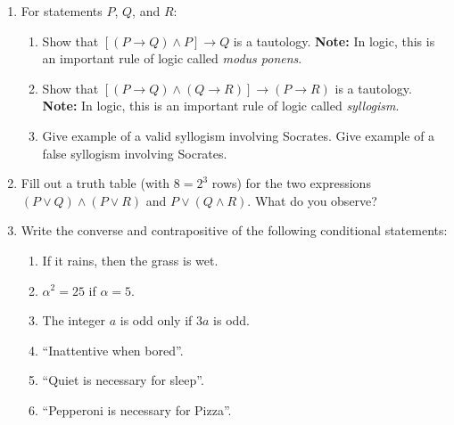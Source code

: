 \documentclass[12pt]{article}
\newcommand{\defn}[1]{{\color{blue}\sl #1}}
\begin{document}
\begin{enumerate}
 
\item
  For statements $P$, $Q$, and $R$:
  \begin{enumerate}
    
  \item Show that $[(P\to Q)\wedge P]\to Q$ is a tautology.
      {\bf Note:} In logic, this is an important rule of logic called \defn{modus ponens}.
  \item Show that $[(P\to Q)\wedge (Q\to R)]\to (P\to R)$ is a tautology.
      {\bf Note:} In logic, this is an important rule of logic called \defn{syllogism}.

    \item Give example of a valid syllogism involving Socrates.
          Give example of a false syllogism involving Socrates.

  \end{enumerate}


\item Fill out a truth table (with $8=2^3$ rows) for the two  expressions $(P\vee Q)\wedge(P\vee R)$
       and  $P\vee(Q\wedge R)$.   What do you observe?
  


%

\item Write the converse and contrapositive of the following conditional statements:
  \begin{enumerate}
    \item If it rains, then the grass is wet.
    \item $\alpha^2=25$ if $\alpha=5$.
    \item The integer $a$ is odd only if $3a$ is odd.
    \item ``Inattentive when bored''.
    \item ``Quiet is necessary for sleep''.
    \item ``Pepperoni is necessary for Pizza''.
  \end{enumerate}


\end{enumerate}
\end{document}
